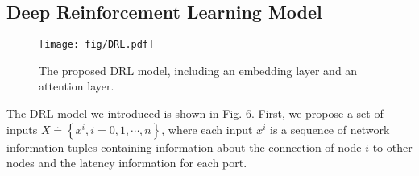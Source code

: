 \documentclass[journal]{IEEEtran}
\begin{document}
\subsection{Deep Reinforcement Learning Model}

\begin{figure}
\centering
\setlength{\abovecaptionskip}{0.cm}
\texttt{[image: fig/DRL.pdf]}
\caption{The proposed DRL model, including an embedding layer and an attention layer. }
\label{fig9}
\vspace{-0.1cm}
\end{figure}
The DRL model we introduced is shown in Fig. 6. First, we propose a set of inputs $X\doteq \left\{ {{x}^{i}},i=0,1,\cdots,n \right\}$, where each input ${{x}^{i}}$ is a sequence of network information tuples containing information about the connection of node $i$ to other nodes and the latency information for each port.
\end{document}

